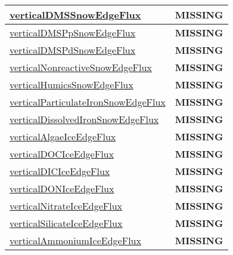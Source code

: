 {\begin{center}
\begin{longtable}{| p{2.0in} | p{4.0in} |}
    \hline
    \hyperref[subsec:var_sec_tracer_edge_fluxes_verticalDMSSnowEdgeFlux]{verticalDMSSnowEdgeFlux} & {\bf \color{red} MISSING} \\
    \hline
    \hyperref[subsec:var_sec_tracer_edge_fluxes_verticalDMSPpSnowEdgeFlux]{verticalDMSPpSnowEdgeFlux} & {\bf \color{red} MISSING} \\
    \hline
    \hyperref[subsec:var_sec_tracer_edge_fluxes_verticalDMSPdSnowEdgeFlux]{verticalDMSPdSnowEdgeFlux} & {\bf \color{red} MISSING} \\
    \hline
    \hyperref[subsec:var_sec_tracer_edge_fluxes_verticalNonreactiveSnowEdgeFlux]{verticalNonreactiveSnowEdge\-Flux} & {\bf \color{red} MISSING} \\
    \hline
    \hyperref[subsec:var_sec_tracer_edge_fluxes_verticalHumicsSnowEdgeFlux]{verticalHumicsSnowEdgeFlux} & {\bf \color{red} MISSING} \\
    \hline
    \hyperref[subsec:var_sec_tracer_edge_fluxes_verticalParticulateIronSnowEdgeFlux]{verticalParticulateIronSnowEdge\-Flux} & {\bf \color{red} MISSING} \\
    \hline
    \hyperref[subsec:var_sec_tracer_edge_fluxes_verticalDissolvedIronSnowEdgeFlux]{verticalDissolvedIronSnowEdge\-Flux} & {\bf \color{red} MISSING} \\
    \hline
    \hyperref[subsec:var_sec_tracer_edge_fluxes_verticalAlgaeIceEdgeFlux]{verticalAlgaeIceEdgeFlux} & {\bf \color{red} MISSING} \\
    \hline
    \hyperref[subsec:var_sec_tracer_edge_fluxes_verticalDOCIceEdgeFlux]{verticalDOCIceEdgeFlux} & {\bf \color{red} MISSING} \\
    \hline
    \hyperref[subsec:var_sec_tracer_edge_fluxes_verticalDICIceEdgeFlux]{verticalDICIceEdgeFlux} & {\bf \color{red} MISSING} \\
    \hline
    \hyperref[subsec:var_sec_tracer_edge_fluxes_verticalDONIceEdgeFlux]{verticalDONIceEdgeFlux} & {\bf \color{red} MISSING} \\
    \hline
    \hyperref[subsec:var_sec_tracer_edge_fluxes_verticalNitrateIceEdgeFlux]{verticalNitrateIceEdgeFlux} & {\bf \color{red} MISSING} \\
    \hline
    \hyperref[subsec:var_sec_tracer_edge_fluxes_verticalSilicateIceEdgeFlux]{verticalSilicateIceEdgeFlux} & {\bf \color{red} MISSING} \\
    \hline
    \hyperref[subsec:var_sec_tracer_edge_fluxes_verticalAmmoniumIceEdgeFlux]{verticalAmmoniumIceEdgeFlux} & {\bf \color{red} MISSING} \\

\end{longtable}
\end{center}}
